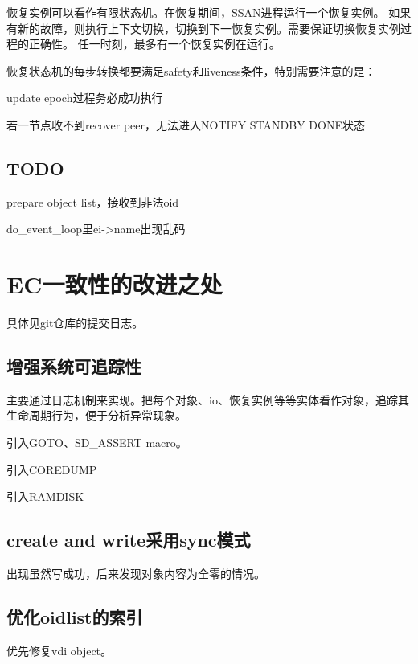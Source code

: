 恢复实例可以看作有限状态机。在恢复期间，SSAN进程运行一个恢复实例。
如果有新的故障，则执行上下文切换，切换到下一恢复实例。需要保证切换恢复实例过程的正确性。
任一时刻，最多有一个恢复实例在运行。

恢复状态机的每步转换都要满足safety和liveness条件，特别需要注意的是：
\begin{enumbox}
\item update epoch过程务必成功执行
\item 若一节点收不到recover peer，无法进入NOTIFY STANDBY DONE状态
\end{enumbox}

\subsection{TODO}

\begin{enumbox}
\item prepare object list，接收到非法oid
\item do\_event\_loop里ei->name出现乱码
\end{enumbox}

\section{EC一致性的改进之处}

具体见git仓库的提交日志。

\subsection{增强系统可追踪性}

主要通过日志机制来实现。把每个对象、io、恢复实例等等实体看作对象，追踪其生命周期行为，便于分析异常现象。

引入GOTO、SD\_ASSERT macro。

引入COREDUMP

引入RAMDISK

\subsection{create and write采用sync模式}

出现虽然写成功，后来发现对象内容为全零的情况。

\subsection{优化oidlist的索引}

优先修复vdi object。

